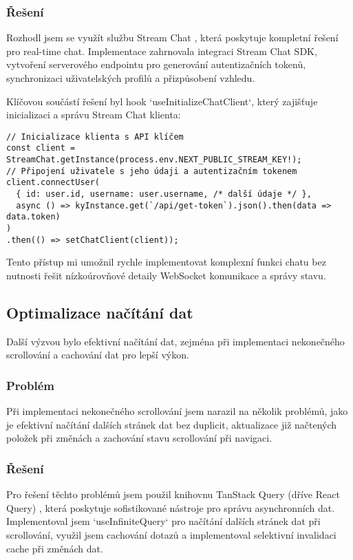 \documentclass[12pt]{article}
\begin{document}
\subsubsection{Řešení}
Rozhodl jsem se využít službu Stream Chat \citep{StreamChat}, která poskytuje kompletní řešení pro real-time chat. Implementace zahrnovala integraci Stream Chat SDK, vytvoření serverového endpointu pro generování autentizačních tokenů, synchronizaci uživatelských profilů a přizpůsobení vzhledu.

Klíčovou součástí řešení byl hook `useInitializeChatClient`, který zajišťuje inicializaci a správu Stream Chat klienta:

\begin{lstlisting}[style=typescript]
// Inicializace klienta s API klíčem
const client = StreamChat.getInstance(process.env.NEXT_PUBLIC_STREAM_KEY!);
// Připojení uživatele s jeho údaji a autentizačním tokenem
client.connectUser(
  { id: user.id, username: user.username, /* další údaje */ },
  async () => kyInstance.get(`/api/get-token`).json().then(data => data.token)
)
.then(() => setChatClient(client));
\end{lstlisting}

Tento přístup mi umožnil rychle implementovat komplexní funkci chatu bez nutnosti řešit nízkoúrovňové detaily WebSocket komunikace a správy stavu.

\subsection{Optimalizace načítání dat}

Další výzvou bylo efektivní načítání dat, zejména při implementaci nekonečného scrollování a cachování dat pro lepší výkon.

\subsubsection{Problém}

Při implementaci nekonečného scrollování jsem narazil na několik problémů, jako je efektivní načítání dalších stránek dat bez duplicit, aktualizace již načtených položek při změnách a zachování stavu scrollování při navigaci.

\subsubsection{Řešení}

Pro řešení těchto problémů jsem použil knihovnu TanStack Query (dříve React Query) \citep{TanStackQuery}, která poskytuje sofistikované nástroje pro správu asynchronních dat. Implementoval jsem `useInfiniteQuery` pro načítání dalších stránek dat při scrollování, využil jsem cachování dotazů a implementoval selektivní invalidaci cache při změnách dat.
\end{document}
